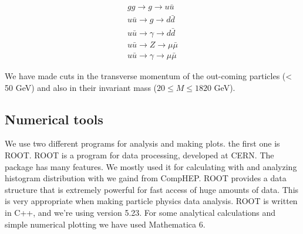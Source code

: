 \begin{align}
gg \rightarrow g \rightarrow u \bar u \nonumber \\ \nonumber
u \bar u \rightarrow g \rightarrow d \bar d \\ \nonumber
u \bar u \rightarrow \gamma \rightarrow d \bar d \\ \nonumber
u \bar u \rightarrow Z \rightarrow \mu \bar \mu \\ \nonumber
u \bar u \rightarrow \gamma \rightarrow \mu \bar \mu 
\end{align}

We have made cuts in the transverse momentum of the out-coming particles (< 50 GeV) and also in their invariant mass ($20 \leq M \leq 1820$ GeV).

\subsection{Numerical tools}
We use two different programs for analysis and making plots. the first one is ROOT. ROOT is a program for data processing, developed at CERN. The package has many features. We mostly used it for calculating with and analyzing histogram distribution with we gaind from CompHEP. ROOT provides a data structure that is extremely powerful for fast access of huge amounts of data. This is very appropriate when making particle physics data analysis. ROOT is written in C++, and we're using version 5.23. For some analytical calculations and simple numerical plotting we have used Mathematica 6.